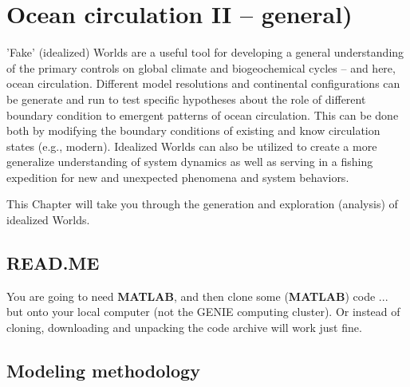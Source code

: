 
\cleardoublepage


\chapter{Ocean circulation II -- general)}\label{ch:ocean-circulation-II}

\hfill \break

\noindent 'Fake' (idealized) Worlds are a useful tool for developing a general understanding of the primary controls on global climate and  biogeochemical cycles -- and here, ocean circulation. Different model resolutions and continental configurations can be generate and run to test specific hypotheses about the role of different boundary condition to emergent patterns of ocean circulation. This can be done both by modifying the boundary conditions of existing and know circulation states (e.g., modern). Idealized Worlds can also be utilized to create a more generalize understanding of system dynamics as well as serving in a fishing expedition for new and unexpected phenomena and system behaviors.

This Chapter will take you through the generation and exploration (analysis) of idealized Worlds.

\newpage

\section*{READ.ME}

You are going to need \textbf{MATLAB}, and then clone some (\textbf{MATLAB}) code ... but onto your local computer (not the GENIE computing cluster). Or instead of cloning, downloading and unpacking the code archive will work just fine.



\newpage

\section{Modeling methodology}

